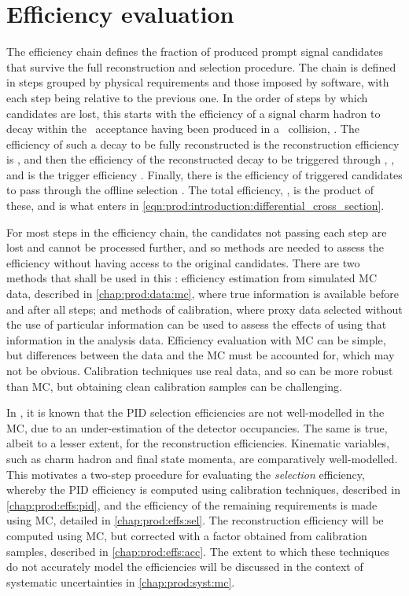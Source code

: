 \chapter{Efficiency evaluation}
\label{chap:prod:effs}

The efficiency chain defines the fraction of produced prompt signal candidates 
that survive the full reconstruction and selection procedure.
The chain is defined in steps grouped by physical requirements and those 
imposed by software, with each step being relative to the previous one.
In the order of steps by which candidates are lost, this starts with the efficiency of a signal charm hadron to decay within the 
\lhcb\ acceptance having been produced in a \pp\ collision, \effacc.
The efficiency of such a decay to be fully reconstructed is the reconstruction 
efficiency is \effreco, and then the efficiency of the reconstructed decay to 
be triggered through \lzero, \hltone, and \hlttwo is the trigger efficiency 
\efftrig.
Finally, there is the efficiency of triggered candidates to pass through the 
offline selection \effoffline.
The total efficiency, \eff, is the product of these, and is what enters in 
\cref{eqn:prod:introduction:differential_cross_section}.

For most steps in the efficiency chain, the candidates not passing each step 
are lost and cannot be processed further, and so methods are needed to assess the 
efficiency without having access to the original candidates.
There are two methods that shall be used in this : 
efficiency estimation from simulated \acf{MC} data, described in 
\cref{chap:prod:data:mc}, where true information is available before and after 
all steps; and methods of calibration, where proxy data selected without the 
use of particular information can be used to assess the effects of using that information in the 
analysis data.
Efficiency evaluation with \ac{MC} can be simple, but differences between the 
data and the \ac{MC} must be accounted for, which may not be obvious.
Calibration techniques use real data, and so can be more robust than \ac{MC}, 
but obtaining clean calibration samples can be challenging.

In \lhcb, it is known that the \ac{PID} selection efficiencies are not 
well-modelled in the \ac{MC}, due to an under-estimation of the detector 
occupancies.
The same is true, albeit to a lesser extent, for the reconstruction 
efficiencies.
Kinematic variables, such as charm hadron and final state momenta, are 
comparatively well-modelled.
This motivates a two-step procedure for evaluating the \emph{selection} 
efficiency, whereby the \ac{PID} efficiency is computed using calibration 
techniques, described in \cref{chap:prod:effs:pid}, and the efficiency of the remaining 
requirements is made using \ac{MC}, detailed in \cref{chap:prod:effs:sel}.
The reconstruction efficiency will be computed using \ac{MC}, but corrected 
with a factor obtained from calibration samples, described in \cref{chap:prod:effs:acc}.
The extent to which these techniques do not accurately model the efficiencies 
will be discussed in the context of systematic uncertainties in 
\cref{chap:prod:syst:mc}.

